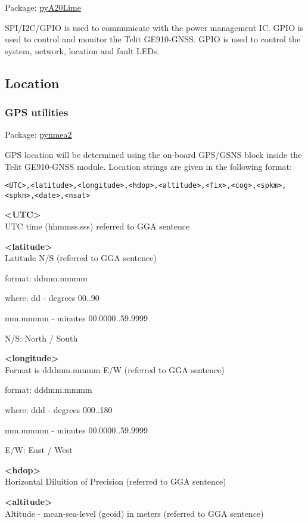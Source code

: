 Package:	\href{https://pypi.python.org/pypi/pyA20Lime}{pyA20Lime}

SPI/I2C/GPIO is used to communicate with the power management IC. GPIO is used to control and monitor the Telit GE910-GNSS. GPIO is used to control the system, network, location and fault LEDs.
    
\subsection{Location}

\subsubsection{GPS utilities}

Package:	\href{https://github.com/Knio/pynmea2}{pynmea2}

GPS location will be determined using the on-board GPS/GSNS block inside the Telit GE910-GNSS module. Location strings are given in the following format:
\begin{lstlisting}
<UTC>,<latitude>,<longitude>,<hdop>,<altitude>,<fix>,<cog>,<spkm>,<spkn>,<date>,<nsat>
\end{lstlisting}

\textbf{<UTC>} \\
UTC time (hhmmss.sss) referred to GGA sentence

\textbf{<latitude>} \\
Latitude N/S (referred to GGA sentence)
	
format:
ddmm.mmmm
					
where:
dd - degrees
00..90

mm.mmmm - minutes
00.0000..59.9999

N/S: North / South 

\textbf{<longitude>} \\
Format is dddmm.mmmm E/W (referred to GGA sentence) 

format:
dddmm.mmmm

where:
ddd - degrees						
000..180

mm.mmmm - minutes				
00.0000..59.9999

E/W: East / West

\textbf{<hdop>} \\
Horizontal Diluition of Precision (referred to GGA sentence) 

\textbf{<altitude>} \\
Altitude - mean-sea-level (geoid) in meters (referred to GGA sentence)

